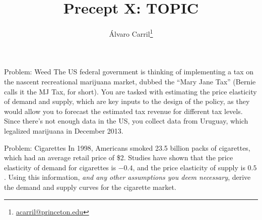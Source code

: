 \documentclass[10pt]{beamer}
\title{Precept X: TOPIC}
\author{Álvaro Carril\thanks{\url{acarril@princeton.edu}}}
\institute{511c - Microeconomics \\ Princeton University}
\begin{document}
\begin{frame}
    \maketitle
\end{frame}

\begin{frame}[t]{Problem: Weed}
    The US federal government is thinking of implementing a tax on the nascent recreational marijuana market, dubbed the ``Mary Jane Tax'' (Bernie calls it the MJ Tax, for short).
    You are tasked with estimating the price elasticity of demand and supply, which are key inputs to the design of the policy, as they would allow you to forecast the estimated tax revenue for different tax levels.
    Since there's not enough data in the US, you collect data from Uruguay, which legalized marijuana in December 2013.
\end{frame}

\begin{frame}[t]{Problem: Cigarettes}
    In 1998, Americans smoked 23.5 billion packs of cigarettes, which had an average retail price of \$2.
    Studies have shown that the price elasticity of demand for cigarettes is \(-0.4\), and the price elasticity of supply is \(0.5\).
    Using this information, \emph{and any other assumptions you deem necessary}, derive the demand and supply curves for the cigarette market.
\end{frame}
\end{document}
